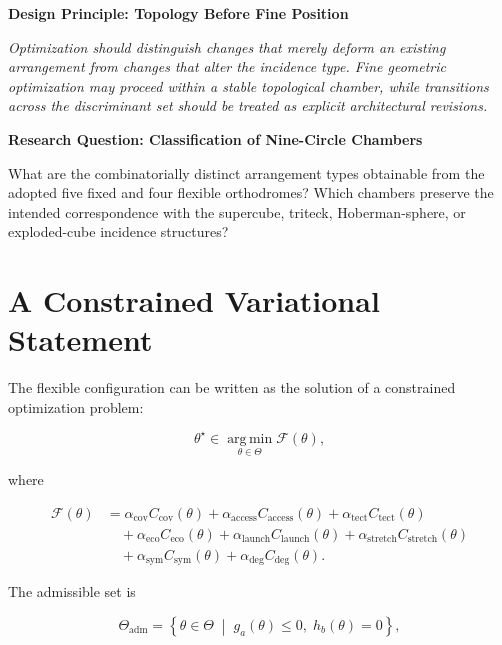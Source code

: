 \documentclass[11pt,fleqn]{book}
\numberwithin{equation}{chapter}
\newenvironment{principle}[1]
  {\begin{principleEnv}
   \noindent\textbf{Design Principle: #1}\par\smallskip\itshape}
  {\end{principleEnv}}
\newenvironment{research}[1]
  {\begin{researchEnv}
   \noindent\textbf{Research Question: #1}\par\smallskip}
  {\end{researchEnv}}
\theoremstyle{plain}
\theoremstyle{definition}
\theoremstyle{remark}
\newcommand{\argmin}{\operatorname*{arg\,min}}
\newcommand{\suchthat}{\;\middle|\;}
\begin{document}
\begin{principle}{Topology Before Fine Position}
Optimization should distinguish changes that merely deform an existing arrangement from changes that alter the incidence type. Fine geometric optimization may proceed within a stable topological chamber, while transitions across the discriminant set should be treated as explicit architectural revisions.
\end{principle}

\begin{research}{Classification of Nine-Circle Chambers}
What are the combinatorially distinct arrangement types obtainable from the adopted five fixed and four flexible orthodromes? Which chambers preserve the intended correspondence with the supercube, triteck, Hoberman-sphere, or exploded-cube incidence structures?
\end{research}

\section{A Constrained Variational Statement}

The flexible configuration can be written as the solution of a constrained optimization problem:

\begin{equation}
    \theta^\star
    \in
    \argmin_{\theta\in\Theta}
    \mathcal{F}(\theta),
\end{equation}

where

\begin{align}
\mathcal{F}(\theta)
&=
\alpha_{\mathrm{cov}}C_{\mathrm{cov}}(\theta)
+
\alpha_{\mathrm{access}}C_{\mathrm{access}}(\theta)
+
\alpha_{\mathrm{tect}}C_{\mathrm{tect}}(\theta)
\\
&\quad
+
\alpha_{\mathrm{eco}}C_{\mathrm{eco}}(\theta)
+
\alpha_{\mathrm{launch}}C_{\mathrm{launch}}(\theta)
+
\alpha_{\mathrm{stretch}}C_{\mathrm{stretch}}(\theta)
\\
&\quad
+
\alpha_{\mathrm{sym}}C_{\mathrm{sym}}(\theta)
+
\alpha_{\mathrm{deg}}C_{\mathrm{deg}}(\theta).
\end{align}

The admissible set is

\begin{equation}
    \Theta_{\mathrm{adm}}
    =
    \left\{
    \theta\in\Theta
    \suchthat
    g_a(\theta)\leq 0,
    \;
    h_b(\theta)=0
    \right\},
\end{equation}
\end{document}
